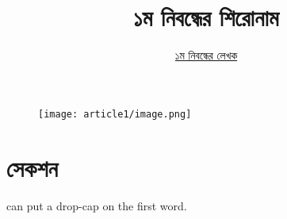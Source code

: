 \documentclass[12pt]{article}
\begin{document}
\begin{figure}[t]
        \centering
        \texttt{[image: article1/image.png]}
\end{figure}

\title{১ম নিবন্ধের শিরোনাম}
\author{\href{https://github.com/rafisics/ebook-template}{১ম নিবন্ধের লেখক}}
\date{}


\section{সেকশন}

 can put a drop-cap on the first word. 
\lipsum



\end{document}
